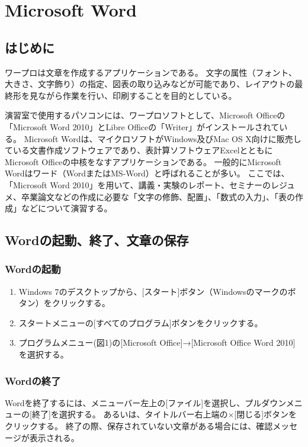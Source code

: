 \chapter{Microsoft Word}

\section{はじめに}
ワープロは文章を作成するアプリケーションである。
文字の属性（フォント、大きさ、文字飾り）の指定、図表の取り込みなどが可能であり、レイアウトの最終形を見ながら作業を行い、印刷することを目的としている。

演習室で使用するパソコンには、ワープロソフトとして、Microsoft Officeの「Microsoft Word 2010」とLibre Officeの「Writer」がインストールされている。
Microsoft Wordは、マイクロソフトがWindows及びMac OS X向けに販売している文書作成ソフトウェアであり、表計算ソフトウェアExcelとともにMicrosoft Officeの中核をなすアプリケーションである。
一般的にMicrosoft Wordはワード（WordまたはMS-Word）と呼ばれることが多い。
ここでは、「Microsoft Word 2010」を用いて、講義・実験のレポート、セミナーのレジュメ、卒業論文などの作成に必要な「文字の修飾、配置」、「数式の入力」、「表の作成」などについて演習する。

\section{Wordの起動、終了、文章の保存}
\subsection{Wordの起動}
\begin{enumerate}
\item Windows 7のデスクトップから、[スタート]ボタン（Windowsのマークのボタン）をクリックする。
\item スタートメニューの[すべてのプログラム]ボタンをクリックする。
\item プログラムメニュー(図1)の[Microsoft Office]→[Microsoft Office Word 2010]を選択する。
\end{enumerate}

\subsection{Wordの終了}
Wordを終了するには、メニューバー左上の[ファイル]を選択し、プルダウンメニューの[終了]を選択する。
あるいは、タイトルバー右上端の×[閉じる]ボタンをクリックする。
終了の際、保存されていない文章がある場合には、確認メッセージが表示される。

